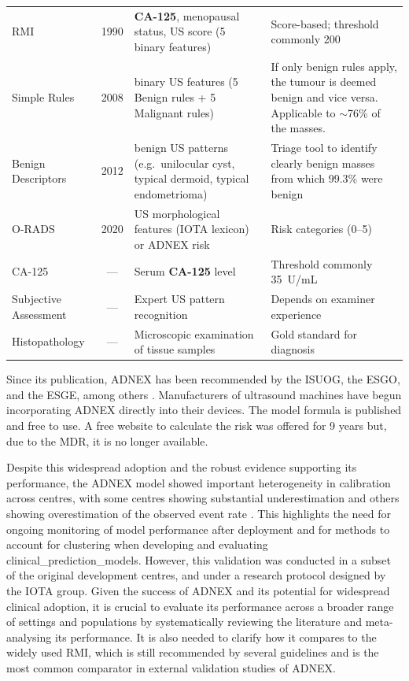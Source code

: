 \begin{table}[t]
\begin{tabularx}{\textwidth}{@{} l c >{\raggedright\arraybackslash}X >{\raggedright\arraybackslash}X @{}}
RMI \cite{jacobsRiskMalignancyIndex1990} & 1990 & \textbf{CA-125}, menopausal status, US score (5 binary features) & Score-based; threshold commonly 200 \\
\addlinespace
Simple Rules \cite{timmermanSimpleUltrasoundbasedRules2008} & 2008 & 10 binary US features (5 Benign rules + 5 Malignant rules) & If only benign rules apply, the tumour is deemed benign and vice versa. Applicable to $\sim$76\% of the masses.  \\
\addlinespace
Benign Descriptors \cite{ameyeClinicallyOrientedThreeStep2012} & 2012 & 4 benign US patterns (e.g.\ unilocular cyst, typical dermoid, typical endometrioma) & Triage tool to identify clearly benign masses from which 99.3\% were benign \\
\addlinespace
O-RADS \cite{andreottiORADSUSRisk2020} & 2020 & US morphological features (IOTA lexicon) or ADNEX risk & Risk categories (0--5)\\
\addlinespace
CA-125 & --- & Serum \textbf{CA-125} level & Threshold commonly 35~U/mL \\
\addlinespace
Subjective Assessment & --- & Expert US pattern recognition & Depends on examiner experience \\
Histopathology & --- & Microscopic examination of tissue samples & Gold standard for diagnosis \\
\bottomrule
\end{tabularx}
\end{table}

Since its publication, \gls{ADNEX} has been recommended by the \gls{ISUOG}, the \gls{ESGO}, and the \gls{ESGE}, among others \cite{timmermanESGOISUOGIOTA2021}. Manufacturers of ultrasound machines have begun incorporating \gls{ADNEX} directly into their devices. The model formula is published and free to use. A free website to calculate the risk was offered for 9 years but, due to the \gls{MDR}, it is no longer available. 

Despite this widespread adoption and the robust evidence supporting its performance, the ADNEX model showed important \gls{heterogeneity} in \gls{calibration} across centres, with some centres showing substantial underestimation and others showing overestimation of the observed event rate \cite{vancalsterValidationModelsDiagnose2020}. This highlights the need for ongoing monitoring of model performance after deployment and for methods to account for clustering when developing and evaluating \glspl{clinical_prediction_model}. However, this validation was conducted in a subset of the original development centres, and under a research protocol designed by the IOTA group. Given the success of \gls{ADNEX} and its potential for widespread clinical adoption, it is crucial to evaluate its performance across a broader range of settings and populations by systematically reviewing the literature and meta-analysing its performance. It is also needed to clarify how it compares to the widely used RMI, which is still recommended by several guidelines and is the most common comparator in external validation studies of \gls{ADNEX}.

